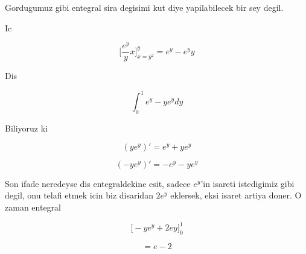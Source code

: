 \documentclass[12pt,fleqn]{article}\usepackage{../common}
\begin{document}
Gordugumuz gibi entegral sira degisimi kut diye yapilabilecek bir sey
degil. 

Ic

\[ \bigg[ \frac{e^y}{y}x \bigg]_{x=y^2}^{y} = 
e^y - e^yy
\]

Dis

\[ \int_0^1 e^y - ye^y dy  \]

Biliyoruz ki 

\[ (ye^y)' = e^y + ye^y \]

\[ (-ye^y)' = -e^y - ye^y \]

Son ifade neredeyse dis entegraldekine esit, sadece $e^y$'in isareti
istedigimiz gibi degil, onu telafi etmek icin biz disaridan $2e^y$
eklersek, eksi isaret artiya doner. O zaman entegral 

\[ \bigg[ -ye^y + 2ey \bigg]_0^1 \]

\[ = e - 2 \]
\end{document}
